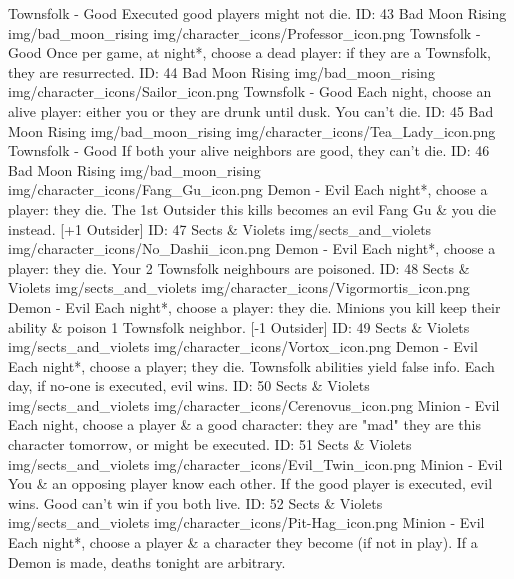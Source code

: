 	{\color{goodcolor}Townsfolk - Good}
	{Executed good players might not die.}        
	{ID: 43}
	{Bad Moon Rising}
	{img/bad_moon_rising}
	{img/character_icons/Professor_icon.png}
	{\color{goodcolor}Townsfolk - Good}
	{Once per game, at night*, choose a dead player: if they are a Townsfolk, they are resurrected.}        
	{ID: 44}
	{Bad Moon Rising}
	{img/bad_moon_rising}
	{img/character_icons/Sailor_icon.png}
	{\color{goodcolor}Townsfolk - Good}
	{Each night, choose an alive player: either you or they are drunk until dusk. You can't die.}        
	{ID: 45}
	{Bad Moon Rising}
	{img/bad_moon_rising}
	{img/character_icons/Tea_Lady_icon.png}
	{\color{goodcolor}Townsfolk - Good}
	{If both your alive neighbors are good, they can't die.}        
	{ID: 46}
	{Bad Moon Rising}
	{img/bad_moon_rising}
	{img/character_icons/Fang_Gu_icon.png}
	{\color{evilcolor}Demon - Evil}
	{Each night*, choose a player: they die. The 1st Outsider this kills becomes an evil Fang Gu \& you die instead. [+1 Outsider]}        
	{ID: 47}
	{Sects \& Violets}
	{img/sects_and_violets}
	{img/character_icons/No_Dashii_icon.png}
	{\color{evilcolor}Demon - Evil}
	{Each night*, choose a player: they die. Your 2 Townsfolk neighbours are poisoned.}        
	{ID: 48}
	{Sects \& Violets}
	{img/sects_and_violets}
	{img/character_icons/Vigormortis_icon.png}
	{\color{evilcolor}Demon - Evil}
	{Each night*, choose a player: they die. Minions you kill keep their ability \& poison 1 Townsfolk neighbor. [-1 Outsider]}        
	{ID: 49}
	{Sects \& Violets}
	{img/sects_and_violets}
	{img/character_icons/Vortox_icon.png}
	{\color{evilcolor}Demon - Evil}
	{Each night*, choose a player; they die. Townsfolk abilities yield false info. Each day, if no-one is executed, evil wins.}        
	{ID: 50}
	{Sects \& Violets}
	{img/sects_and_violets}
	{img/character_icons/Cerenovus_icon.png}
	{\color{evilcolor}Minion - Evil}
	{Each night, choose a player \& a good character: they are "mad" they are this character tomorrow, or might be executed.}        
	{ID: 51}
	{Sects \& Violets}
	{img/sects_and_violets}
	{img/character_icons/Evil_Twin_icon.png}
	{\color{evilcolor}Minion - Evil}
	{You \& an opposing player know each other. If the good player is executed, evil wins. Good can't win if you both live.}        
	{ID: 52}
	{Sects \& Violets}
	{img/sects_and_violets}
	{img/character_icons/Pit-Hag_icon.png}
	{\color{evilcolor}Minion - Evil}
	{Each night*, choose a player \& a character they become (if not in play). If a Demon is made, deaths tonight are arbitrary.}        
